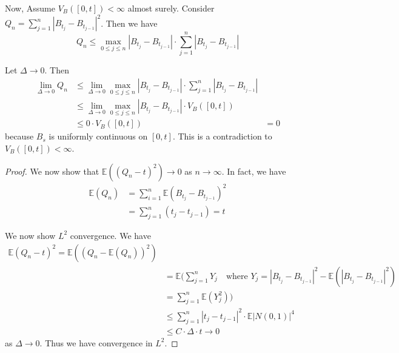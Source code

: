 \documentclass[10pt, oneside, reqno]{amsart}
\theoremstyle{plain}%
\theoremstyle{definition}
\theoremstyle{remark}
\newcommand{\E}{\mathbb{E}}
\begin{document}
Now, Assume $V_B([0,t]) < \infty$ almost surely.  Consider $Q_n = \sum_{j=1}^n | B_{t_j} - B_{t_{j-1}}  |^2$.  Then we have \[
	Q_n \leq \max_{ 0 \leq j \leq n} | B_{t_j} - B_{t_{j-1}} | \cdot \sum_{j=1}^n |B_{t_j} - B_{t_{j-1}} |
\]   

Let $\Delta \rightarrow 0$.  Then \begin{align*}
	\lim_{\Delta \rightarrow 0} Q_n &\leq  \lim_{ \Delta \rightarrow 0}\max_{ 0 \leq j \leq n} | B_{t_j} - B_{t_{j-1}} | \cdot \sum_{j=1}^n |B_{t_j} - B_{t_{j-1}} | \\
									&\leq \lim_{ \Delta \rightarrow 0}\max_{ 0 \leq j \leq n} | B_{t_j} - B_{t_{j-1}} | \cdot V_B([0,t]) \\
									&\leq 0 \cdot V_B([0,t])
									&= 0
\end{align*} because $B_s$ is uniformly continuous on $[0,t]$.  This is a contradiction to $V_B([0,t]) < \infty$.


\begin{proof}
	We now show that $\E((Q_n - t)^2) \rightarrow 0$ as $n \rightarrow \infty$.  In fact, we have
	\begin{align*}
		\E(Q_n) &= \sum_{i=1}^n \E(B_{t_j} - B_{t_{j-1}})^2 \\
				&= \sum_{j=1}^n (t_j - t_{j-1}) = t
	\end{align*}
	
	We now show $L^2$ convergence. We have \begin{align*}
		\E(Q_n - t)^2 = \E((Q_n - \E(Q_n))^2) \\
					&= \E(\sum_{j=1}^n Y_j \quad \text{where $Y_j = |B_{t_j} - B_{t_{j-1}}|^2 - \E(|B_{t_j} - B_{t_{j-1}}|^2)$} \\
					&= \sum_{j=1}^n \E(Y_j^2) ) \\
					&\leq \sum_{j=1}^n | t_{j} - t_{j-1} |^2 \cdot \E | N(0,1) |^4 \\
					&\leq C \cdot \Delta \cdot t \rightarrow 0
	\end{align*} as $\Delta \rightarrow 0$.  Thus we have convergence in $L^2$.  
\end{proof}


\end{document}
